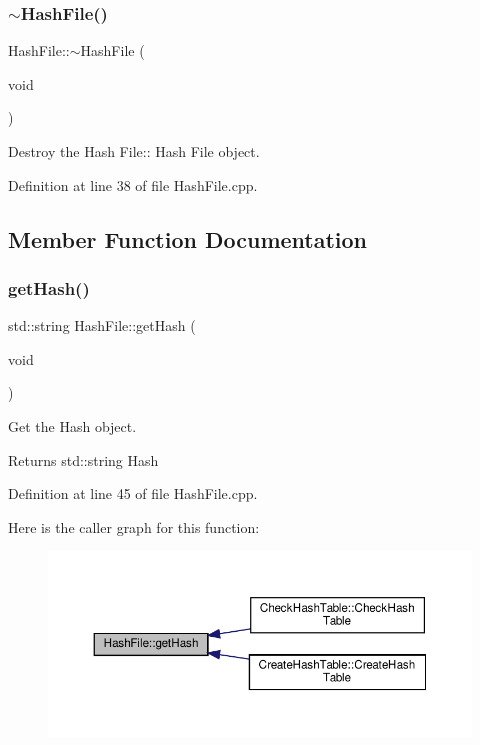 \subsubsection{\texorpdfstring{$\sim$\+Hash\+File()}{~HashFile()}}
{\footnotesize\ttfamily Hash\+File\+::$\sim$\+Hash\+File (\begin{DoxyParamCaption}\item[{void}]{ }\end{DoxyParamCaption})}



Destroy the Hash File\+:\+: Hash File object. 



Definition at line 38 of file Hash\+File.\+cpp.



\subsection{Member Function Documentation}
\mbox{\label{class_hash_file_a63590090cde4f86ec04687f7f380fb71}} 
\subsubsection{\texorpdfstring{get\+Hash()}{getHash()}}
{\footnotesize\ttfamily std\+::string Hash\+File\+::get\+Hash (\begin{DoxyParamCaption}\item[{void}]{ }\end{DoxyParamCaption})}



Get the Hash object. 

\begin{DoxyReturn}{Returns}
std\+::string Hash 
\end{DoxyReturn}


Definition at line 45 of file Hash\+File.\+cpp.

Here is the caller graph for this function\+:
\nopagebreak
\begin{figure}[H]
\begin{center}
\leavevmode
\includegraphics[width=350pt]{d0/dd4/class_hash_file_a63590090cde4f86ec04687f7f380fb71_icgraph}
\end{center}
\end{figure}


